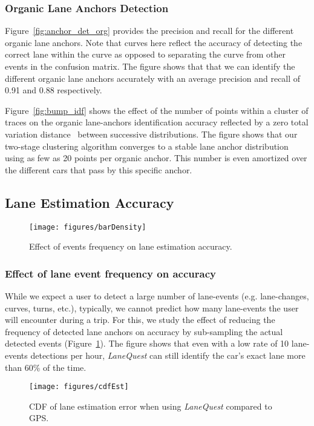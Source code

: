 \documentclass[10pt, conference, compsocconf]{IEEEtran}
\def \sys {\textit{LaneQuest}}
\newcommand{\figscale}{0.7}
\begin{document}
\subsubsection{Organic Lane Anchors Detection}
Figure~\ref{fig:anchor_det_org} provides the precision and recall for the different organic lane anchors. Note that curves here reflect the accuracy of detecting the correct lane within the curve as opposed to separating the curve from other events in the confusion matrix. The figure shows that that we can identify the different organic lane anchors accurately with an average precision and recall of 0.91 and 0.88 respectively.

Figure~\ref{fig:bump_idf} shows the effect of the number of points within a cluster of traces on the
organic lane-anchors identification accuracy reflected by a zero total variation distance~\cite{levin2009markov} between successive distributions. The figure shows that our two-stage clustering algorithm converges to a stable lane anchor distribution using as few as 20 points per organic anchor. This number is even amortized over the different cars that pass by this specific anchor. 

\subsection{Lane Estimation Accuracy}
\begin{figure}[!t]
\centering
\texttt{[image: figures/barDensity]}
\caption{Effect of events frequency on lane estimation accuracy.}
\label{fig:cdf_density}
\end{figure}
\subsubsection{Effect of lane event frequency on accuracy}
While we expect a user to detect a large number of lane-events (e.g. lane-changes, curves, turns, etc.), typically, we cannot predict how many lane-events the user will encounter during a trip. For this, we study the effect of reducing the frequency of detected lane anchors on accuracy by sub-sampling the actual detected events (Figure~\ref{fig:cdf_density}). The figure shows that even with a low rate of 10 lane-events detections per hour, \sys{} can still identify the car's exact lane more than 60\% of the time. 
\begin{figure}[!t]
\centering
\texttt{[image: figures/cdfEst]}
\caption{CDF of lane estimation error when using \sys{} compared to GPS.}
\label{fig:error_cdf}
\end{figure}
\end{document}
